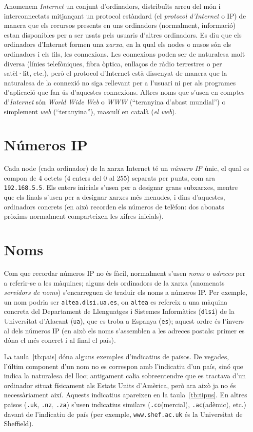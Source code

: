 Anomenem \emph{Internet} un conjunt d'ordinadors, distribuïts arreu
del món i interconnectats mitjançant un protocol estàndard (el
\emph{protocol d'Internet} o IP) de manera que els recursos presents
en uns ordinadors (normalment, informació) estan disponibles per a ser
usats pels usuaris d'altres ordinadors. Es diu que els ordinadors
d'Internet formen una \emph{xarxa}, en la qual els nodes o nusos són
els ordinadors i els fils, les connexions. Les connexions poden ser de
naturalesa molt diversa (línies telefòniques, fibra òptica, enllaços
de ràdio terrestres o per satèl·lit, etc.), però el protocol
d'Internet està dissenyat de manera que la naturalesa de la connexió
no siga rellevant per a l'usuari ni per als programes d'aplicació que
fan ús d'aquestes connexions. Altres noms que s'usen en comptes
d'\emph{Internet} són \emph{World Wide Web} o \emph{WWW} (``teranyina
d'abast mundial'') o simplement \emph{web} (``teranyina''), masculí en
català (\emph{el web}).

\section{Números IP}
Cada node (cada ordinador) de la xarxa Internet té un {\em número IP}
únic, el qual es compon de 4 octets (4 enters del 0 al 255) separats
per punts, com ara {\tt 192.168.5.5}. Els enters inicials s'usen per a
designar grans subxarxes, mentre que els finals s'usen per a designar
xarxes més menudes, i dins d'aquestes, ordinadors concrets (en això
recorden els números de telèfon: dos abonats pròxims normalment
comparteixen les xifres inicials).

\section{Noms}
Com que recordar números IP no és fàcil, normalment s'usen \emph{noms}
o \emph{adreces} per a referir-se a les màquines; alguns dels
ordinadors de la xarxa (anomenats \emph{servidors de noms})
s'encarreguen de traduir els noms a números IP.  Per exemple, un nom
podria ser \texttt{altea.dlsi.ua.es}, on \texttt{altea} es refereix a
una màquina concreta del Departament de Llenguatges i Sistemes
Informàtics (\texttt{dlsi}) de la Universitat d'Alacant (\texttt{ua}),
que es troba a Espanya (\texttt{es}); aquest ordre és l'invers al dels
números IP (en això els noms s'assemblen a les adreces postals: primer
es dóna el més concret i al final el país).

La taula~\ref{tb:pais} dóna alguns exemples d'indicatius de països. De
vegades, l'últim component d'un nom no es correspon amb l'indicatiu
d'un país, sinó que indica la naturalesa del lloc; antigament calia
sobreentendre que es tractava d'un ordinador situat físicament als
Estats Units d'Amèrica, però ara això ja no és necessàriament
així. Aquests indicatius apareixen en la taula~\ref{tb:tipus}. En
altres països ({\tt .uk}, {\tt .nz}, {\tt .za}) s'usen indicatius
similars ({\tt .co}(mercial), {\tt .ac}(adèmic), etc.) davant de
l'indicatiu de país (per exemple, {\tt www.shef.ac.uk} és la
Universitat de Sheffield).

